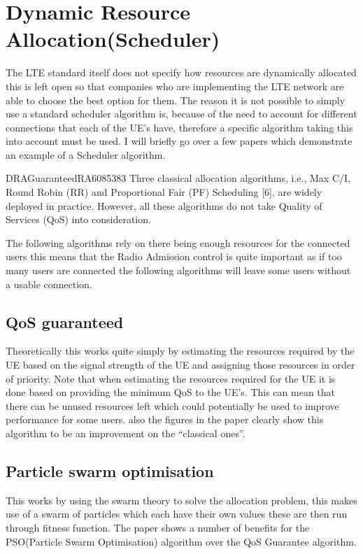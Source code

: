 \section{Dynamic Resource Allocation(Scheduler)}
{
	The LTE standard itself does not specify how resources are dynamically allocated this is left open so that companies who are implementing the LTE network are able to choose the best option for them. The reason it is not possible to simply use a standard scheduler algorithm is, because of the need to account for different connections that each of the UE's have, therefore a specific algorithm taking this into account must be used. I will briefly go over a few papers which demonstrate an example of a Scheduler algorithm.
	\begin{displaycquote}{DRAGuaranteedRA6085383}
		Three classical allocation algorithms, i.e., Max C/I, Round Robin (RR) and Proportional Fair (PF) Scheduling [6], are widely deployed in practice. However, all these algorithms do not take Quality of Services (QoS) into consideration.
	\end{displaycquote}
	The following algorithms rely on there being enough resources for the connected users this means that the Radio Admission control is quite important as if too many users are connected the following algorithms will leave some users without a usable connection.
	\subsection{QoS guaranteed \cite{DRAGuaranteedRA6085383}}
	{
		Theoretically this works quite simply by estimating the resources required by the UE based on the signal strength of the UE and assigning those resources in order of priority. Note that when estimating the resources required for the UE it is done based on providing the minimum QoS to the UE's. This can mean that there can be unused resources left which could potentially be used to improve performance for some users. also the figures in the paper clearly show this algorithm to be an improvement on the \enquote{classical ones}.
	}

	\subsection{Particle swarm optimisation \cite{DRASwarm6388227}}
	{
		This works by using the swarm theory to solve the allocation problem, this makes use of a swarm of particles which each have their own values these are then run through fitness function. The paper shows a number of benefits for the PSO(Particle Swarm Optimisation) algorithm over the QoS Guarantee algorithm.
	}

}
